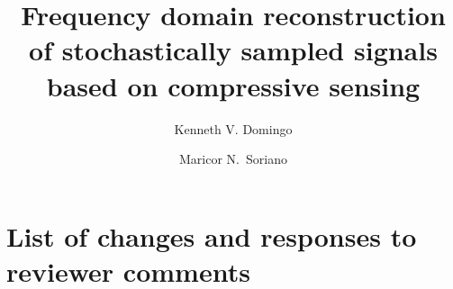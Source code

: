 \documentclass[10pt,a4paper,twoside]{article}
\begin{document}
\title{\TitleFont Frequency domain reconstruction of stochastically sampled signals based on compressive sensing}


\author[*\negthickspace]{Kenneth V. Domingo}
\author[ ]{Maricor N.~Soriano
\lastauthorsep}

\maketitle
\thispagestyle{titlestyle}


\section*{List of changes and responses to reviewer comments}
\medskip
\end{document}
